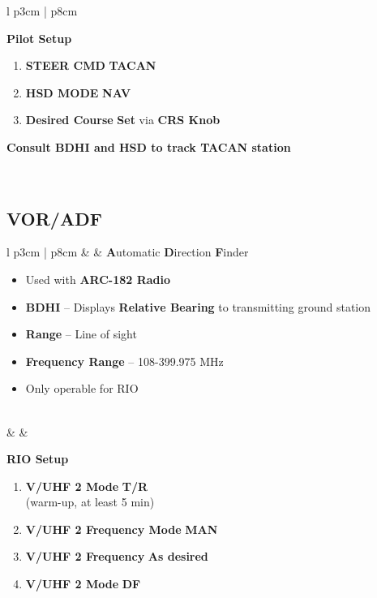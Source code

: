\documentclass[fontHelvetica]{TechCheck}
\begin{document}
\begin{center}
\begin{longtable}{l p{3cm} | p{8cm}}
\begin{minipage}[t]{\linewidth}
\begin{enumerate}
				\end{enumerate}
				\textbf{Pilot Setup}
				\begin{enumerate}
					\item \textbf{STEER CMD} \dotfill \textbf{TACAN}
					\item \textbf{HSD MODE} \dotfill \textbf{NAV}
					\item \textbf{Desired Course} \dotfill \textbf{Set} via \textbf{CRS Knob}
				\end{enumerate}
				\textbf{Consult BDHI and HSD to track TACAN station}
			\end{minipage} \\
			\bottomrule
		\end{longtable}
	\end{center}

	\subsection{VOR/ADF}
	\begin{center}
		\begin{longtable}{l p{3cm} | p{8cm}}
			\toprule
			\textbf{\textbullet} &  & \textbf{A}utomatic \textbf{D}irection \textbf{F}inder

			\begin{minipage}[t]{\linewidth}
				\begin{itemize}
					\item Used with \textbf{ARC-182 Radio}
					\item \textbf{BDHI} -- Displays \textbf{Relative Bearing} to transmitting ground station
					\item \textbf{Range} -- Line of sight
					\item \textbf{Frequency Range} -- 108-399.975 MHz
					\item Only operable for RIO
				\end{itemize}
			\end{minipage} \\
			\midrule
			\textbf{\textbullet} &  &
			\begin{minipage}[t]{\linewidth}
				\vspace{-7pt}
				\textbf{RIO Setup}
				\begin{enumerate}
					\item \textbf{V/UHF 2 Mode} \dotfill \textbf{T/R} \\
					\hfill (warm-up, at least 5 min)
					\item \textbf{V/UHF 2 Frequency Mode} \dotfill \textbf{MAN}
					\item \textbf{V/UHF 2 Frequency} \dotfill \textbf{As desired}
					\item \textbf{V/UHF 2 Mode} \dotfill \textbf{DF}
				\end{enumerate}
			\end{minipage} \\
			\bottomrule
		\end{longtable}
	\end{center}
\end{document}
